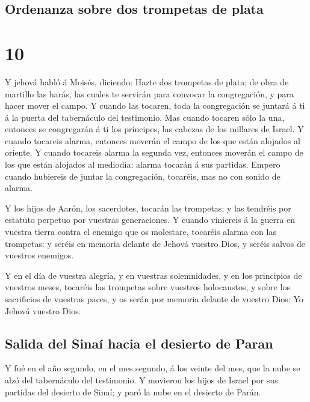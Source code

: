 \hypertarget{ordenanza-sobre-dos-trompetas-de-plata}{%
\subsection{Ordenanza sobre dos trompetas de
plata}\label{ordenanza-sobre-dos-trompetas-de-plata}}

\hypertarget{section-9}{%
\section{10}\label{section-9}}

 Y jehová habló á Moisés, diciendo:  Hazte dos
trompetas de plata; de obra de martillo las harás, las cuales te
servirán para convocar la congregación, y para hacer mover el campo.
 Y cuando las tocaren, toda la congregación se juntará á ti
á la puerta del tabernáculo del testimonio.  Mas cuando
tocaren sólo la una, entonces se congregarán á ti los príncipes, las
cabezas de los millares de Israel.  Y cuando tocareis
alarma, entonces moverán el campo de los que están alojados al oriente.
 Y cuando tocareis alarma la segunda vez, entonces moverán
el campo de los que están alojados al mediodía: alarma tocarán á sus
partidas.  Empero cuando hubiereis de juntar la
congregación, tocaréis, mas no con sonido de alarma.

 Y los hijos de Aarón, los sacerdotes, tocarán las
trompetas; y las tendréis por estatuto perpetuo por vuestras
generaciones.  Y cuando viniereis á la guerra en vuestra
tierra contra el enemigo que os molestare, tocaréis alarma con las
trompetas: y seréis en memoria delante de Jehová vuestro Dios, y seréis
salvos de vuestros enemigos.

 Y en el día de vuestra alegría, y en vuestras
solemnidades, y en los principios de vuestros meses, tocaréis las
trompetas sobre vuestros holocaustos, y sobre los sacrificios de
vuestras paces, y os serán por memoria delante de vuestro Dios: Yo
Jehová vuestro Dios.

\hypertarget{salida-del-sinauxed-hacia-el-desierto-de-paran}{%
\subsection{Salida del Sinaí hacia el desierto de
Paran}\label{salida-del-sinauxed-hacia-el-desierto-de-paran}}

 Y fué en el año segundo, en el mes segundo, á los veinte
del mes, que la nube se alzó del tabernáculo del testimonio.
 Y movieron los hijos de Israel por sus partidas del
desierto de Sinaí; y paró la nube en el desierto de Parán.

